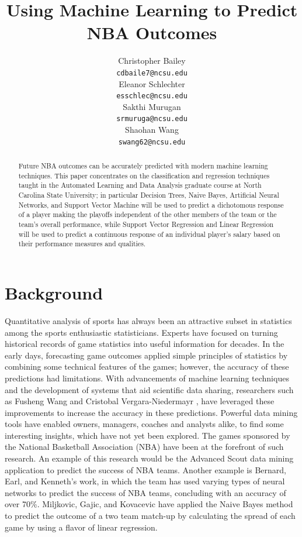 \documentclass{article}
\title{Using Machine Learning to Predict NBA Outcomes}
\author{
Christopher Bailey \\
\texttt{{\tiny cdbaile7@ncsu.edu}} \\
\And 
Eleanor Schlechter \\
\texttt{{\tiny esschlec@ncsu.edu}} \\
\And 
Sakthi Murugan \\
\texttt{{\tiny srmuruga@ncsu.edu}} \\
\And 
Shaohan Wang \\
\texttt{{\tiny swang62@ncsu.edu}} \\
}
\begin{document}
\maketitle

\begin{abstract}
  Future NBA outcomes can be accurately predicted with modern machine learning techniques. 
  This paper concentrates on the classification and regression techniques taught in the Automated Learning and Data Analysis graduate course at North Carolina State University; in particular Decision Trees, Naive Bayes, Artificial Neural Networks, and Support Vector Machine will be used to predict a dichotomous response of a player making the playoffs independent of the other members of the team or the team's overall performance, while Support Vector Regression and Linear Regression will be used to predict a continuous response of an individual player's salary based on their performance measures and qualities. 
\end{abstract}

\section{Background}
Quantitative analysis of sports has always been an attractive subset in statistics among the sports enthusiastic statisticians. 
Experts have focused on turning historical records of game statistics into useful information for decades. 
In the early days, forecasting game outcomes applied simple principles of statistics by combining some technical features of the games; however, the accuracy of these predictions had limitations. 
With advancements of machine learning techniques and the development of systems that aid scientific data sharing, researchers such as Fusheng Wang and Cristobal Vergara-Niedermayr \cite{Wang}, have leveraged these improvements to increase the accuracy in these predictions. 
Powerful data mining tools have enabled owners, managers, coaches and analysts alike, to find some interesting insights, which have not yet been explored. 
The games sponsored by the National Basketball Association (NBA) have been at the forefront of such research. 
An example of this research would be the Advanced Scout \cite{Bhandari} data mining application to predict the success of NBA teams. 
Another example is Bernard, Earl, and Kenneth's \cite{Bernard} work, in which the team has used varying types of neural networks to predict the success of NBA teams, concluding with an accuracy of over 70\%. 
Miljkovic, Gajic, and Kovacevic \cite{Miljkovic} have applied the Naive Bayes method to predict the outcome of a two team match-up by calculating the spread of each game by using a flavor of linear regression.
\end{document}
